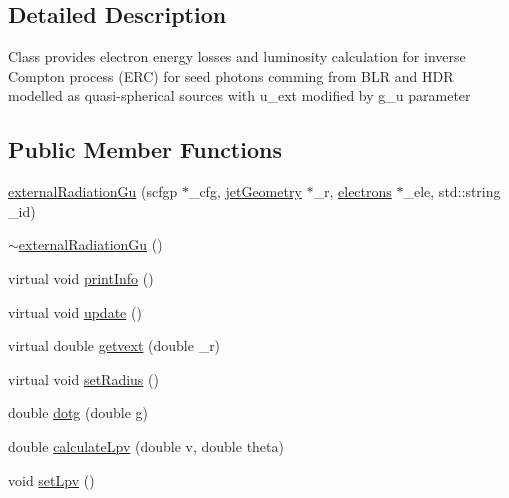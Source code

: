 \subsection{Detailed Description}
Class provides electron energy losses and luminosity calculation for inverse Compton process (E\-R\-C) for seed photons comming from B\-L\-R and H\-D\-R modelled as quasi-\/spherical sources with u\-\_\-ext modified by g\-\_\-u parameter \subsection*{Public Member Functions}
\begin{DoxyCompactItemize}
\item 
\hyperlink{classexternalRadiationGu_aad5903b642f08594be10d699cf9fb3b4}{external\-Radiation\-Gu} (scfgp $\ast$\-\_\-cfg, \hyperlink{classjetGeometry}{jet\-Geometry} $\ast$\-\_\-r, \hyperlink{classelectrons}{electrons} $\ast$\-\_\-ele, std\-::string \-\_\-id)
\item 
\hyperlink{classexternalRadiationGu_afdabb07f9855b4c34a48a5c1901ac467}{$\sim$external\-Radiation\-Gu} ()
\item 
virtual void \hyperlink{classexternalRadiationGu_a8aa28d939b0ecf2651f18cc4f5f6ba25}{print\-Info} ()
\item 
virtual void \hyperlink{classexternalRadiationGu_a730363f393f29aef9927e0bb84087116}{update} ()
\item 
virtual double \hyperlink{classexternalRadiationGu_ab7e1abcc40cf0538404e88a0febdfb02}{getvext} (double \-\_\-r)
\item 
virtual void \hyperlink{classexternalRadiationGu_a541b2bb7da733f10d83af6225b7ad5f8}{set\-Radius} ()
\item 
double \hyperlink{classexternalRadiationGu_a266fc022608ea384a80be8ad840d5957}{dotg} (double g)
\item 
double \hyperlink{classexternalRadiationGu_ab49dc8bf55384ec6acf09bc1732194a4}{calculate\-Lpv} (double v, double theta)
\item 
void \hyperlink{classexternalRadiationGu_a946369eee3485a821a5619c5ba310497}{set\-Lpv} ()
\end{DoxyCompactItemize}
